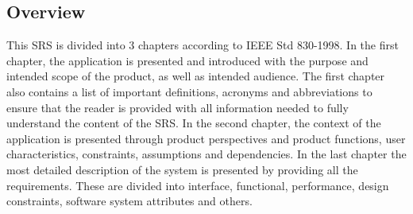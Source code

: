 \subsection{Overview}
This SRS is divided into 3 chapters according to IEEE Std 830-1998. In the first chapter, the application is presented and introduced with the purpose and intended scope of the product, as well as intended audience. The first chapter also contains a list of important definitions, acronyms and abbreviations to ensure that the reader is provided with all information needed to fully understand the content of the SRS. In the second chapter, the context of the application is presented through product perspectives and product functions, user characteristics, constraints, assumptions and dependencies. In the last chapter the most detailed description of the system is presented by providing all the requirements. These are divided into interface, functional, performance, design constraints, software system attributes and others. 
